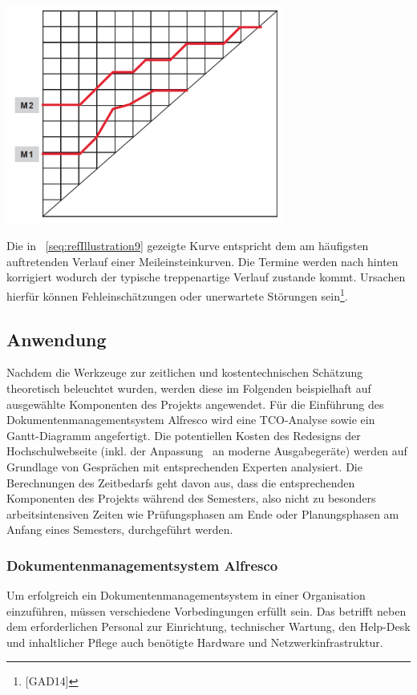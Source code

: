 \documentclass[a4paper]{article}
\makeatletter
\newcommand\captionof[1]{\def\@captype{#1}\caption}
\makeatother
\begin{document}
{\centering \includegraphics[width=9.091cm,height=7.158cm]{INMAusarbeitung02-img/INMAusarbeitung02-img010.png}
\captionof{figure}[Kurvenverlauf der Optimistenschätzung]{Kurvenverlauf der Optimistenschätzung}
\label{seq:refIllustration9}
\par}
{\sffamily
Die in \figurename~\ref{seq:refIllustration9} gezeigte Kurve entspricht dem am häufigsten auftretenden Verlauf einer
Meileinsteinkurven. Die Termine werden nach hinten korrigiert wodurch der typische treppenartige Verlauf zustande
kommt. Ursachen hierfür können Fehleinschätzungen oder unerwartete Störungen sein\footnote{[GAD14]}.}

\subsection[Anwendung]{Anwendung}
{\sffamily
Nachdem die Werkzeuge zur zeitlichen und kostentechnischen Schätzung theoretisch beleuchtet wurden, werden diese im
Folgenden beispielhaft auf ausgewählte Komponenten des Projekts angewendet. Für die Einführung des
Dokumentenmanagementsystem Alfresco wird eine TCO-Analyse sowie ein Gantt-Diagramm angefertigt. Die potentiellen Kosten
des Redesigns der Hochschulwebseite (inkl. der Anpassung \ an moderne Ausgabegeräte) werden auf Grundlage von
Gesprächen mit entsprechenden Experten analysiert. Die Berechnungen des Zeitbedarfs geht davon aus, dass die
entsprechenden Komponenten des Projekts während des Semesters, also nicht zu besonders arbeitsintensiven Zeiten wie
Prüfungsphasen am Ende oder Planungsphasen am Anfang eines Semesters, durchgeführt werden.}

\subsubsection[Dokumentenmanagementsystem Alfresco]{\color{black} Dokumentenmanagementsystem Alfresco}
\label{bkm:RefHeading24767162299686}{\sffamily
Um erfolgreich ein Dokumentenmanagementsystem in einer Organisation einzuführen, müssen verschiedene Vorbedingungen
erfüllt sein. Das betrifft neben dem erforderlichen Personal zur Einrichtung, technischer Wartung, den Help-Desk und
inhaltlicher Pflege auch benötigte Hardware und Netzwerkinfrastruktur.}
\end{document}
